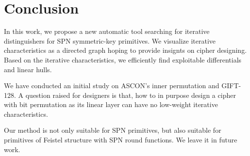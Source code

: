 \section{Conclusion\label{sec:conclusion}}

In this work, we propose a new automatic tool searching for iterative distinguishers for SPN symmetric-key primitives. We visualize iterative characteristics as a directed graph hoping to provide insignts on cipher designing. Based on the iterative characteristics, we efficiently find exploitable differentials and linear hulls. 

We have conducted an initial study on ASCON's inner permutation and GIFT-128. A question raised for designers is that, how to in purpose design a cipher with bit permutation as its linear layer can have no low-weight iterative characteristics. 

Our method is not only suitable for SPN primitives, but also suitable for primitives of Feistel structure with SPN round functions. We leave it in future work. 

